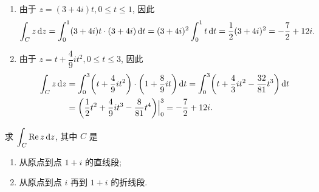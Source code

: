 \begin{solution}
	\begin{enumerate}
		\item 由于 $z=(3+4i)t,0\le t\le 1$, 因此
		\[
			 \int_Cz\,\mathrm{d} z=\int_0^1(3+4i)t\cdot(3+4i)\,\mathrm{d} t
			=(3+4i)^2\int_0^1t\,\mathrm{d} t
			=\frac{1}{2} (3+4i)^2=-\frac72+12i.
		\]
		\item 由于 $z=t+\dfrac49it^2,0\le t\le 3$, 因此
		\begin{align*}
			  \int_Cz\,\mathrm{d} z
			&=\int_0^3\biggl(t+\frac{4}9it^2\biggr)\cdot\biggl(1+\frac89it\biggr)\,\mathrm{d} t
			 =\int_0^3\biggl(t+\frac43it^2-\frac{32}{81}t^3\biggr)\,\mathrm{d} t\\
			&=\biggl(\frac{1}{2} t^2+\frac49it^3-\frac8{81}t^4\biggr)\Big|_0^3
			 =-\frac72+12i.
		\end{align*}
	\end{enumerate}
\end{solution}

\begin{example}
	求 $\displaystyle\int_C\operatorname{Re} z\,\mathrm{d} z$, 其中 $C$ 是
	\begin{enumerate}
		\item 从原点到点 $1+i$ 的直线段;
		\item 从原点到点 $i$ 再到 $1+i$ 的折线段.
	\end{enumerate}
\end{example}

\begin{figure}[hbpt]
	\centering
	\begin{minipage}{.48\textwidth}
		\centering
	\end{minipage}
	\begin{minipage}{.48\textwidth}
		\centering
	\end{minipage}
\end{figure}

